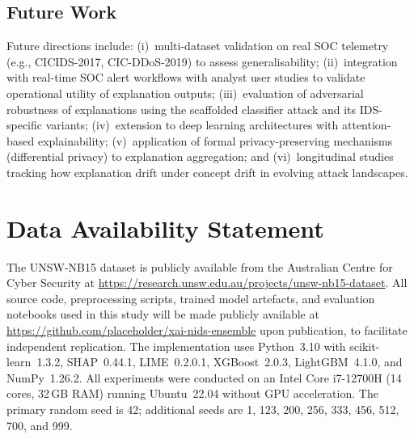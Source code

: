 \documentclass[conference]{IEEEtran}
\begin{document}
\subsection{Future Work}

Future directions include: (i)~multi-dataset validation on real SOC telemetry (e.g., CICIDS-2017, CIC-DDoS-2019) to assess generalisability; (ii)~integration with real-time SOC alert workflows with analyst user studies to validate operational utility of explanation outputs; (iii)~evaluation of adversarial robustness of explanations using the scaffolded classifier attack \cite{slack2020} and its IDS-specific variants; (iv)~extension to deep learning architectures with attention-based explainability; (v)~application of formal privacy-preserving mechanisms (differential privacy) to explanation aggregation; and (vi)~longitudinal studies tracking how explanation drift under concept drift in evolving attack landscapes.

\section*{Data Availability Statement}

The UNSW-NB15 dataset is publicly available from the Australian Centre for Cyber Security \cite{moustafa2015} at \url{https://research.unsw.edu.au/projects/unsw-nb15-dataset}. All source code, preprocessing scripts, trained model artefacts, and evaluation notebooks used in this study will be made publicly available at \url{https://github.com/placeholder/xai-nids-ensemble} upon publication, to facilitate independent replication. The implementation uses Python~3.10 with scikit-learn~1.3.2, SHAP~0.44.1, LIME~0.2.0.1, XGBoost~2.0.3, LightGBM~4.1.0, and NumPy~1.26.2. All experiments were conducted on an Intel Core i7-12700H (14 cores, 32\,GB RAM) running Ubuntu~22.04 without GPU acceleration. The primary random seed is 42; additional seeds are 1, 123, 200, 256, 333, 456, 512, 700, and 999.



\end{document}
